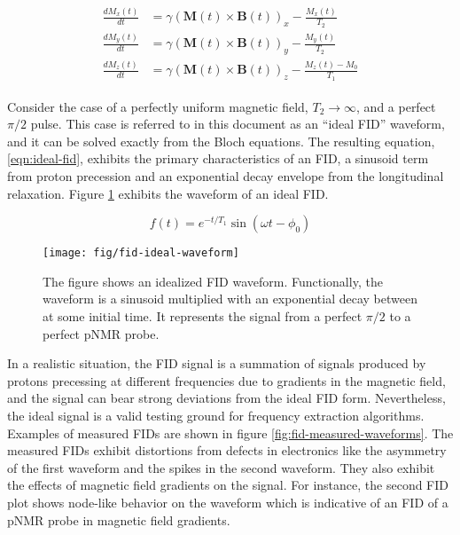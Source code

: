 \begin{align}
\begin{split}
\label{eqn:bloch}
\frac{dM_x(t)}{dt} & = \gamma (\mathbf{M}(t) \times \mathbf{B}(t))_x - \frac{M_x(t)}{T_2} \\
\frac{dM_y(t)}{dt} & = \gamma (\mathbf{M}(t)\times \mathbf{B}(t))_y - \frac{M_y(t)}{T_2} \\
\frac{dM_z(t)}{dt} & = \gamma (\mathbf{M}(t) \times \mathbf{B}(t))_z - \frac{M_z(t) - M_0}{T_1}
\end{split} 
\end{align}

Consider the case of a perfectly uniform magnetic field, $T_2 \rightarrow \infty$, and a perfect $\pi/2$ pulse. This case is referred to in this document as an ``ideal FID'' waveform, and it can be solved exactly from the Bloch equations.  The resulting equation, \ref{eqn:ideal-fid}, exhibits the primary characteristics of an FID, a sinusoid term from proton precession and an exponential decay envelope from the longitudinal relaxation.  Figure \ref{fig:fid-ideal-waveform} exhibits the waveform of an ideal FID.

\begin{equation}
f(t) = e^{-t/T_1} \sin(\omega t - \phi_0)
\label{eqn:ideal-fid}
\end{equation}

\begin{figure}
\label{fig:fid-ideal-waveform}
\centering
\texttt{[image: fig/fid-ideal-waveform]}
\caption{
    The figure shows an idealized FID waveform. Functionally, the waveform is a sinusoid multiplied with an exponential decay between at some initial time.  It represents the signal from a perfect $\pi/2$ to a perfect pNMR probe.
}
\end{figure}

In a realistic situation, the FID signal is a summation of signals produced by protons precessing at different frequencies due to gradients in the magnetic field, and the signal can bear strong deviations from the ideal FID form.  Nevertheless, the ideal signal is a valid testing ground for frequency extraction algorithms.  Examples of measured FIDs are shown in figure \ref{fig:fid-measured-waveforms}.  The measured FIDs exhibit distortions from defects in electronics like the asymmetry of the first waveform and the spikes in the second waveform.  They also exhibit the effects of magnetic field gradients on the signal.  For instance, the second FID plot shows node-like behavior on the waveform which is indicative of an FID of a pNMR probe in magnetic field gradients.

